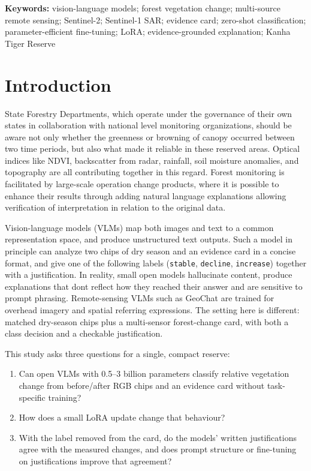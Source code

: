 \documentclass[11pt]{article}
\begin{document}
\noindent
\textbf{Keywords:}
vision-language models;
forest vegetation change;
multi-source remote sensing;
Sentinel-2;
Sentinel-1 SAR;
evidence card;
zero-shot classification;
parameter-efficient fine-tuning;
LoRA;
evidence-grounded explanation;
Kanha Tiger Reserve


\section{Introduction}

State Forestry Departments, which operate under the governance of their own states in collaboration with national level monitoring organizations,
should be aware not only whether the greenness or browning of canopy occurred between
two time periods, but also what made it reliable in these reserved areas. Optical indices like NDVI, backscatter from radar, rainfall, soil moisture anomalies, and topography are all contributing together in this regard.
Forest monitoring is facilitated by large-scale operation change products, where it is possible to enhance their results through adding natural language explanations allowing verification of interpretation in relation to the original data.

Vision-language models (VLMs) map both images and text to a common representation space, and produce unstructured text outputs. Such a model in principle can analyze two chips of dry season and an evidence card in a concise format, and give one of the following labels
(\texttt{stable}, \texttt{decline}, \texttt{increase}) together with a
justification. In reality, small open models hallucinate content, produce explanations that dont reflect how they
reached their answer and are sensitive to
prompt phrasing. Remote-sensing VLMs such as GeoChat are trained for overhead imagery and spatial referring expressions. The setting here is different: matched dry-season chips plus a multi-sensor forest-change card, with both a class decision and a checkable justification.

This study asks three questions for a single, compact reserve:
\begin{enumerate}
\item Can open VLMs with 0.5--3 billion parameters classify relative
vegetation change from before/after RGB chips and an evidence card
without task-specific training?
\item How does a small LoRA update change that
behaviour?
\item With the label removed from the card, do the models' written
justifications agree with the measured changes, and does prompt
structure or fine-tuning on justifications improve that agreement?
\end{enumerate}
\end{document}
